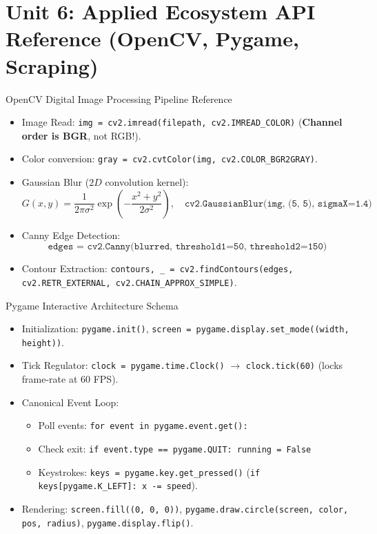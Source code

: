 \chapter{Unit 6: Applied Ecosystem API Reference (OpenCV, Pygame, Scraping)}

\begin{formulabox}{OpenCV Digital Image Processing Pipeline Reference}
\begin{itemize}[leftmargin=1.5em, itemsep=2pt]
    \item Image Read: \texttt{img = cv2.imread(filepath, cv2.IMREAD\_COLOR)} (\textbf{Channel order is BGR}, not RGB!).
    \item Color conversion: \texttt{gray = cv2.cvtColor(img, cv2.COLOR\_BGR2GRAY)}.
    \item Gaussian Blur ($2D$ convolution kernel):
    \begin{equation}
    G(x, y) = \frac{1}{2\pi \sigma^2} \exp\left(-\frac{x^2 + y^2}{2\sigma^2}\right), \quad \texttt{cv2.GaussianBlur(img, (5, 5), sigmaX=1.4)}
    \end{equation}
    \item Canny Edge Detection:
    \begin{equation*}
    \texttt{edges = cv2.Canny(blurred, threshold1=50, threshold2=150)}
    \end{equation*}
    \item Contour Extraction: \texttt{contours, \_ = cv2.findContours(edges, cv2.RETR\_EXTERNAL, cv2.CHAIN\_APPROX\_SIMPLE)}.
\end{itemize}
\end{formulabox}

\begin{formulabox}{Pygame Interactive Architecture Schema}
\begin{itemize}[leftmargin=1.5em, itemsep=2pt]
    \item Initialization: \texttt{pygame.init()}, \texttt{screen = pygame.display.set\_mode((width, height))}.
    \item Tick Regulator: \texttt{clock = pygame.time.Clock()} $\to$ \texttt{clock.tick(60)} (locks frame-rate at 60 FPS).
    \item Canonical Event Loop:
    \begin{itemize}
        \item Poll events: \texttt{for event in pygame.event.get():}
        \item Check exit: \texttt{if event.type == pygame.QUIT: running = False}
        \item Keystrokes: \texttt{keys = pygame.key.get\_pressed()} (\texttt{if keys[pygame.K\_LEFT]: x -= speed}).
    \end{itemize}
    \item Rendering: \texttt{screen.fill((0, 0, 0))}, \texttt{pygame.draw.circle(screen, color, pos, radius)}, \texttt{pygame.display.flip()}.
\end{itemize}
\end{formulabox}

